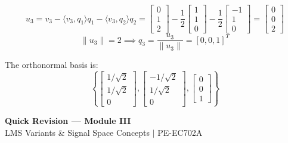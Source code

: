 \documentclass[12pt,a4paper]{article}
\begin{document}
\begin{tcolorbox}[examplebox, title={Example: Gram-Schmidt Orthonormalization}]
\begin{enumerate}[label=\textbf{\arabic*.}, leftmargin=*, itemsep=4pt]
\[    \]
    \[
      u_3 = v_3 - \langle v_3, q_1 \rangle q_1 - \langle v_3, q_2 \rangle q_2 = \begin{bmatrix} 0 \\ 1 \\ 2 \end{bmatrix} - \frac{1}{2}\begin{bmatrix} 1 \\ 1 \\ 0 \end{bmatrix} - \frac{1}{2}\begin{bmatrix} -1 \\ 1 \\ 0 \end{bmatrix} = \begin{bmatrix} 0 \\ 0 \\ 2 \end{bmatrix}
    \]
    \[
      \|u_3\| = 2 \implies q_3 = \frac{u_3}{\|u_3\|} = [0, 0, 1]^T
    \]
\end{enumerate}
The orthonormal basis is:
\[
  \left\{ \begin{bmatrix} 1/\sqrt{2} \\ 1/\sqrt{2} \\ 0 \end{bmatrix}, \begin{bmatrix} -1/\sqrt{2} \\ 1/\sqrt{2} \\ 0 \end{bmatrix}, \begin{bmatrix} 0 \\ 0 \\ 1 \end{bmatrix} \right\}
\]
\end{tcolorbox}

\newpage
\begin{center}
  {\large\bfseries\color{myred} Quick Revision --- Module III}\\[3pt]
  {\small\color{mydark} LMS Variants \& Signal Space Concepts $|$ PE-EC702A}
\end{center}
\noindent{\color{myred}\rule{\linewidth}{1.2pt}}
\vspace{4pt}
\end{document}
